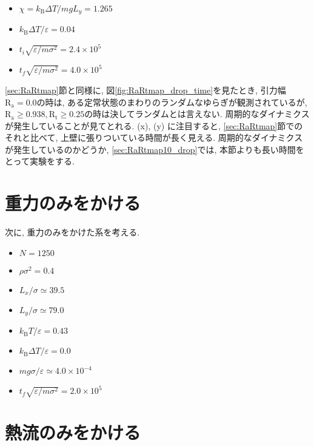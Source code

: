 \begin{itemize}
  \item $\chi = k_{\text{B}}\Delta T / mg L_y = 1.265$
  \item $k_{\text{B}} \Delta T/\varepsilon = 0.04$
  \item $t_i \sqrt{\varepsilon / m \sigma^2} = 2.4 \times 10^{5}$
  \item $t_f \sqrt{\varepsilon / m \sigma^2} = 4.0 \times 10^{5}$
\end{itemize}



\ref{sec:RaRtmap}節と同様に, 図\ref{fig:RaRtmap_drop_time}を見たとき, 引力幅$\text{R}_\text{a}=0.0$の時は, ある定常状態のまわりのランダムなゆらぎが観測されているが, $\text{R}_\text{a} \ge 0.938, \text{R}_\text{t} \ge 0.25$の時は決してランダムとは言えない. 周期的なダイナミクスが発生していることが見てとれる. (x), (y) に注目すると, \ref{sec:RaRtmap}節でのそれと比べて, 上壁に張りついている時間が長く見える. 周期的なダイナミクスが発生しているのかどうか, \ref{sec:RaRtmap10_drop}では, 本節よりも長い時間をとって実験をする. 

\section{重力のみをかける}

次に, 重力のみをかけた系を考える. 

\begin{itemize}
  \item $N = 1250$
  \item $\rho {\sigma}^2 = 0.4$
  \item $L_x / \sigma \simeq 39.5$
  \item $L_y / \sigma \simeq 79.0$
  \item $k_{\text{B}} T / \varepsilon = 0.43$
  \item $k_{\text{B}} \Delta T / \varepsilon = 0.0$
  \item $mg\sigma/\varepsilon \simeq 4.0 \times 10^{-4}$
  \item $t_f \sqrt{\varepsilon / m \sigma^2} = 2.0 \times 10^{5}$
\end{itemize}



\section{熱流のみをかける}

